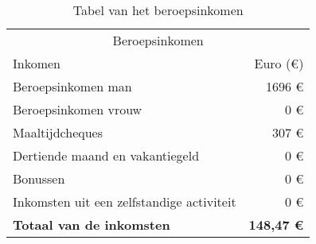\begin{table}[!htbp]
	\centering
	\begin{tabular}{@{}lr@{}} \toprule
		\multicolumn{2}{c}{Beroepsinkomen} \\ \cmidrule(r){1-2}
		Inkomen    										& Euro (\euro{})\\ \midrule
		Beroepsinkomen man      						& 1696 \euro{} \\
		Beroepsinkomen vrouw    						& 0 \euro{} \\
		Maaltijdcheques       							& 307 \euro{} \\
		Dertiende maand en vakantiegeld  				& 0 \euro{} \\
		Bonussen 										& 0 \euro{} \\
		Inkomsten uit een zelfstandige activiteit		& 0 \euro{} \\
		\toprule
		\textbf{Totaal van de inkomsten}              	& \textbf{148,47 \euro{}}   \\ \bottomrule
	\end{tabular}
	\caption{Tabel van het beroepsinkomen}
	\label{tab:tabelberoepsinkomen}
\end{table}




